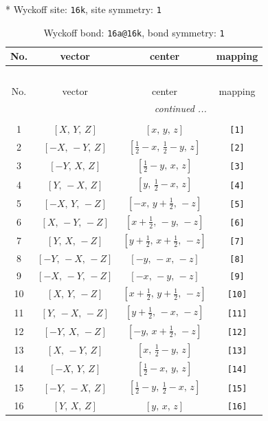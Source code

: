 \documentclass[fleqn,8pt]{jsarticle}
\begin{document}
* Wyckoff site: {\tt 16k}, site symmetry: {\tt 1}
\renewcommand{\arraystretch}{1.2}
\begin{longtable}{cccc}
\caption{Wyckoff bond: {\tt 16a@16k}, bond symmetry: {\tt 1}}
 \\
 \hline \hline
No. & vector & center & mapping \\ \hline \endfirsthead

\multicolumn{3}{l}{\tablename\ \thetable{}} \\
 \hline \hline
No. & vector & center & mapping \\ \hline \endhead

 \hline \hline
\multicolumn{3}{r}{\footnotesize\it continued ...} \\ \endfoot

 \hline \hline
\multicolumn{3}{r}{} \\ \endlastfoot

1 & $\left[ X,\, Y,\, Z \right]$ & $\left[ x,\, y,\, z \right]$ & {\tt [1]} \\ \hline
2 & $\left[ - X,\, - Y,\, Z \right]$ & $\left[ \frac{1}{2} - x,\, \frac{1}{2} - y,\, z \right]$ & {\tt [2]} \\ \hline
3 & $\left[ - Y,\, X,\, Z \right]$ & $\left[ \frac{1}{2} - y,\, x,\, z \right]$ & {\tt [3]} \\ \hline
4 & $\left[ Y,\, - X,\, Z \right]$ & $\left[ y,\, \frac{1}{2} - x,\, z \right]$ & {\tt [4]} \\ \hline
5 & $\left[ - X,\, Y,\, - Z \right]$ & $\left[ - x,\, y + \frac{1}{2},\, - z \right]$ & {\tt [5]} \\ \hline
6 & $\left[ X,\, - Y,\, - Z \right]$ & $\left[ x + \frac{1}{2},\, - y,\, - z \right]$ & {\tt [6]} \\ \hline
7 & $\left[ Y,\, X,\, - Z \right]$ & $\left[ y + \frac{1}{2},\, x + \frac{1}{2},\, - z \right]$ & {\tt [7]} \\ \hline
8 & $\left[ - Y,\, - X,\, - Z \right]$ & $\left[ - y,\, - x,\, - z \right]$ & {\tt [8]} \\ \hline
9 & $\left[ - X,\, - Y,\, - Z \right]$ & $\left[ - x,\, - y,\, - z \right]$ & {\tt [9]} \\ \hline
10 & $\left[ X,\, Y,\, - Z \right]$ & $\left[ x + \frac{1}{2},\, y + \frac{1}{2},\, - z \right]$ & {\tt [10]} \\ \hline
11 & $\left[ Y,\, - X,\, - Z \right]$ & $\left[ y + \frac{1}{2},\, - x,\, - z \right]$ & {\tt [11]} \\ \hline
12 & $\left[ - Y,\, X,\, - Z \right]$ & $\left[ - y,\, x + \frac{1}{2},\, - z \right]$ & {\tt [12]} \\ \hline
13 & $\left[ X,\, - Y,\, Z \right]$ & $\left[ x,\, \frac{1}{2} - y,\, z \right]$ & {\tt [13]} \\ \hline
14 & $\left[ - X,\, Y,\, Z \right]$ & $\left[ \frac{1}{2} - x,\, y,\, z \right]$ & {\tt [14]} \\ \hline
15 & $\left[ - Y,\, - X,\, Z \right]$ & $\left[ \frac{1}{2} - y,\, \frac{1}{2} - x,\, z \right]$ & {\tt [15]} \\ \hline
16 & $\left[ Y,\, X,\, Z \right]$ & $\left[ y,\, x,\, z \right]$ & {\tt [16]} \\
\end{longtable}
\end{document}
